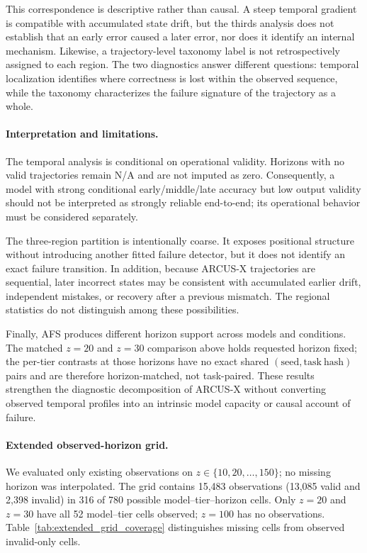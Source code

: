 \documentclass{article}
\begin{document}
This correspondence is descriptive rather than causal. A steep temporal
gradient is compatible with accumulated state drift, but the thirds analysis
does not establish that an early error caused a later error, nor does it
identify an internal mechanism. Likewise, a trajectory-level taxonomy label is
not retrospectively assigned to each region. The two diagnostics answer
different questions: temporal localization identifies where correctness is
lost within the observed sequence, while the taxonomy characterizes the
failure signature of the trajectory as a whole.

\paragraph{Interpretation and limitations.}
The temporal analysis is conditional on operational validity. Horizons with no
valid trajectories remain N/A and are not imputed as zero. Consequently, a
model with strong conditional early/middle/late accuracy but low output
validity should not be interpreted as strongly reliable end-to-end; its
operational behavior must be considered separately.

The three-region partition is intentionally coarse. It exposes positional
structure without introducing another fitted failure detector, but it does not
identify an exact failure transition. In addition, because ARCUS-X trajectories
are sequential, later incorrect states may be consistent with accumulated
earlier drift, independent mistakes, or recovery after a previous mismatch.
The regional statistics do not distinguish among these possibilities.

Finally, AFS produces different horizon support across models and conditions.
The matched $z=20$ and $z=30$ comparison above holds requested horizon fixed;
the per-tier contrasts at those horizons have no exact shared
$(\mathrm{seed},\mathrm{task\ hash})$ pairs and are therefore horizon-matched,
not task-paired. These results strengthen the diagnostic decomposition of
ARCUS-X without converting observed temporal profiles into an intrinsic model
capacity or causal account of failure.

\paragraph{Extended observed-horizon grid.}
We evaluated only existing observations on $z\in\{10,20,\ldots,150\}$; no
missing horizon was interpolated. The grid contains 15,483 observations
(13,085 valid and 2,398 invalid) in 316 of 780 possible model--tier--horizon
cells. Only $z=20$ and $z=30$ have all 52 model--tier cells observed; $z=100$
has no observations. Table~\ref{tab:extended_grid_coverage} distinguishes
missing cells from observed invalid-only cells.
\end{document}
